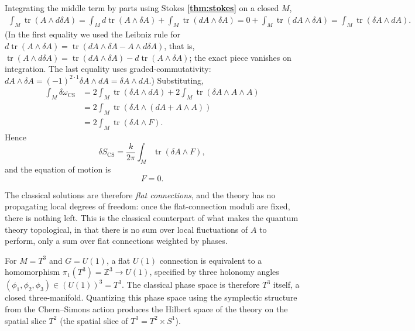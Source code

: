 \documentclass[11pt]{article}
\newcommand{\Z}{\mathbb{Z}}
\newcommand{\tr}{\operatorname{tr}}
\newcommand{\CS}{\operatorname{CS}}
\theoremstyle{definition}
\numberwithin{theorem}{section}
\numberwithin{equation}{section}
\begin{document}
\medskip

\noindent Integrating the middle term by parts using Stokes \textbf{\ref{thm:stokes}} on a closed $M$,
\begin{align*}
\int_M \tr(A\wedge d\delta A) = \int_M d\tr(A\wedge \delta A) + \int_M \tr(dA \wedge \delta A) = 0 + \int_M \tr(dA\wedge \delta A) = \int_M \tr(\delta A\wedge dA).
\end{align*}
(In the first equality we used the Leibniz rule for $d\tr(A\wedge\delta A) = \tr(dA\wedge\delta A - A\wedge d\delta A)$, that is, $\tr(A\wedge d\delta A) = \tr(dA\wedge\delta A) - d\tr(A\wedge\delta A)$; the exact piece vanishes on integration. The last equality uses graded-commutativity: $dA\wedge\delta A = (-1)^{2\cdot 1}\delta A\wedge dA = \delta A\wedge dA$.) Substituting,
\begin{align*}
\int_M \delta\omega_{\CS} &= 2\int_M \tr(\delta A\wedge dA) + 2\int_M \tr(\delta A\wedge A\wedge A) \\
&= 2\int_M \tr\left(\delta A\wedge (dA + A\wedge A)\right) \\
&= 2\int_M \tr(\delta A\wedge F).
\end{align*}
Hence
\begin{equation}\label{eq:deltaS}
\delta S_{\CS} = \frac{k}{2\pi}\int_M \tr(\delta A\wedge F),
\end{equation}
and the equation of motion is
\begin{equation}\label{eq:EOM}
F = 0.
\end{equation}

\noindent The classical solutions are therefore \emph{flat connections}, and the theory has no propagating local degrees of freedom: once the flat-connection moduli are fixed, there is nothing left. This is the classical counterpart of what makes the quantum theory topological, in that there is no sum over local fluctuations of $A$ to perform, only a sum over flat connections weighted by phases.

\begin{example}\label{ex:flat-torus}
For $M = T^3$ and $G = U(1)$, a flat $U(1)$ connection is equivalent to a homomorphism $\pi_1(T^3) = \Z^3 \to U(1)$, specified by three holonomy angles $(\phi_1,\phi_2,\phi_3)\in (U(1))^3 = T^3$. The classical phase space is therefore $T^3$ itself, a closed three-manifold. Quantizing this phase space using the symplectic structure from the Chern--Simons action produces the Hilbert space of the theory on the spatial slice $T^2$ (the spatial slice of $T^3 = T^2\times S^1$).
\end{example}
\end{document}

